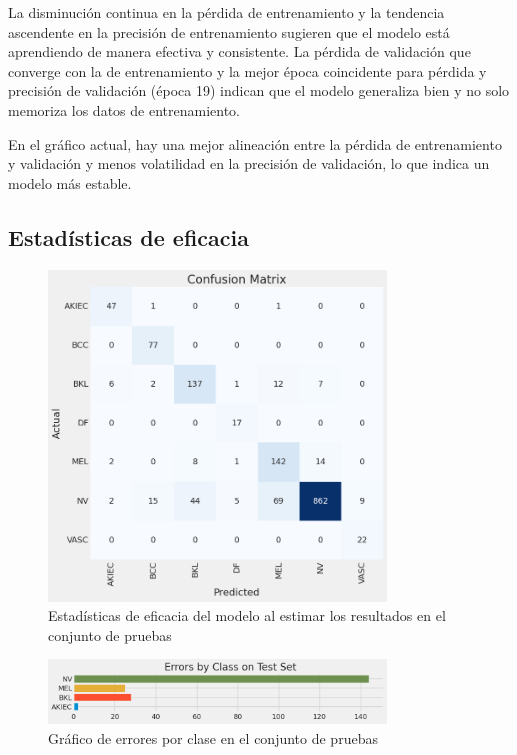 La disminución continua en la pérdida de entrenamiento y la tendencia ascendente en la precisión de entrenamiento sugieren que el modelo está aprendiendo de manera efectiva y consistente. La pérdida de validación que converge con la de entrenamiento y la mejor época coincidente para pérdida y precisión de validación (época 19) indican que el modelo generaliza bien y no solo memoriza los datos de entrenamiento.

En el gráfico actual, hay una mejor alineación entre la pérdida de entrenamiento y validación y menos volatilidad en la precisión de validación, lo que indica un modelo más estable.

\subsection*{Estadísticas de eficacia}\label{sub:accuracy_statistic_p2}
    
\begin{figure}[ht]%
   \begin{center}
   \includegraphics[width=0.8\textwidth]{./Graphics/confussionMatrix_p3.png}
   \caption{Estadísticas de eficacia del modelo al estimar los resultados en el conjunto de pruebas\label{fig:confussion_matrix_p3}}
   \end{center}
   \end{figure}

   \begin{figure}[ht]%
      \begin{center}
      \includegraphics[width=0.8\textwidth]{./Graphics/errorByClass_p3.png}
      \caption{Gráfico de errores por clase en el conjunto de pruebas\label{fig:class_errors_p3}}
      \end{center}
      \end{figure}

